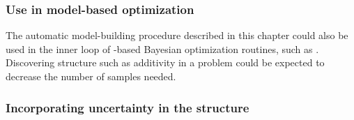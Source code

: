 \subsubsection{Use in model-based optimization}
The automatic model-building procedure described in this chapter could also be used in the inner loop of \gp{}-based Bayesian optimization routines, such as \citet{snoek2012practical}.
Discovering structure such as additivity in a problem could be expected to decrease the number of samples needed.


\subsubsection{Incorporating uncertainty in the structure}
\fi


\outbpdocument{


}
